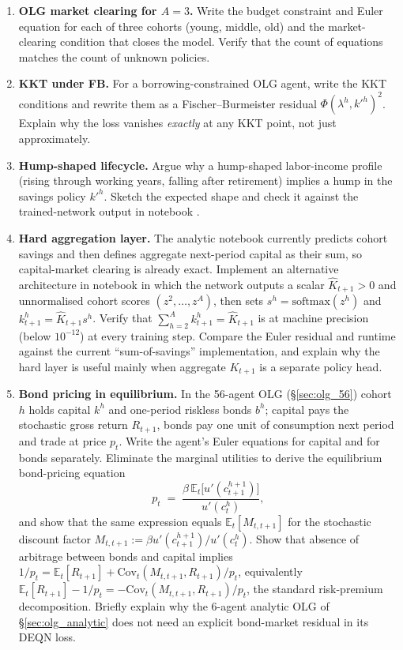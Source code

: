 \documentclass[11pt,a4paper]{report}
\begin{document}
\begin{enumerate}[itemsep=4pt, leftmargin=*]
\item\label{ex:ch5:1} \textbf{OLG market clearing for $A=3$.}  Write the budget constraint and Euler equation for each of three cohorts (young, middle, old) and the market-clearing condition that closes the model.  Verify that the count of equations matches the count of unknown policies.
\item\label{ex:ch5:2} \textbf{KKT under FB.}  For a borrowing-constrained OLG agent, write the KKT conditions and rewrite them as a Fischer--Burmeister residual $\Phi(\lambda^h, k'^h)^2$.  Explain why the loss vanishes \emph{exactly} at any KKT point, not just approximately.
\item\label{ex:ch5:3} \textbf{Hump-shaped lifecycle.}  Argue why a hump-shaped labor-income profile (rising through working years, falling after retirement) implies a hump in the savings policy $k'^h$.  Sketch the expected shape and check it against the trained-network output in notebook .
\item\label{ex:ch5:4} \textbf{Hard aggregation layer.}  The analytic notebook currently predicts cohort savings and then defines aggregate next-period capital as their sum, so capital-market clearing is already exact.  Implement an alternative architecture in notebook  in which the network outputs a scalar $\widehat K_{t+1}>0$ and unnormalised cohort scores $(z^2,\ldots,z^A)$, then sets $s^h=\mathrm{softmax}(z^h)$ and $k_{t+1}^h=\widehat K_{t+1}s^h$.  Verify that $\sum_{h=2}^{A} k_{t+1}^h=\widehat K_{t+1}$ is at machine precision (below $10^{-12}$) at every training step.  Compare the Euler residual and runtime against the current ``sum-of-savings'' implementation, and explain why the hard layer is useful mainly when aggregate $K_{t+1}$ is a separate policy head.
\item\label{ex:ch5:5} \textbf{Bond pricing in equilibrium.}  In the 56-agent OLG (\S\ref{sec:olg_56}) cohort $h$ holds capital $k^h$ and one-period riskless bonds $b^h$; capital pays the stochastic gross return $R_{t+1}$, bonds pay one unit of consumption next period and trade at price $p_t$.  Write the agent's Euler equations for capital and for bonds separately.  Eliminate the marginal utilities to derive the equilibrium bond-pricing equation
\[
   p_t \;=\; \frac{\beta\,\mathbb{E}_t\!\bigl[u'(c^{h+1}_{t+1})\bigr]}{u'(c^h_t)},
\]
and show that the same expression equals $\mathbb{E}_t[M_{t,t+1}]$ for the stochastic discount factor $M_{t,t+1}:=\beta u'(c^{h+1}_{t+1})/u'(c^h_t)$.  Show that absence of arbitrage between bonds and capital implies $1/p_t = \mathbb{E}_t[R_{t+1}] + \mathrm{Cov}_t(M_{t,t+1}, R_{t+1})/p_t$, equivalently $\mathbb{E}_t[R_{t+1}] - 1/p_t = -\mathrm{Cov}_t(M_{t,t+1}, R_{t+1})/p_t$, the standard risk-premium decomposition.  Briefly explain why the 6-agent analytic OLG of \S\ref{sec:olg_analytic} does not need an explicit bond-market residual in its DEQN loss.

\end{enumerate}
\end{document}
